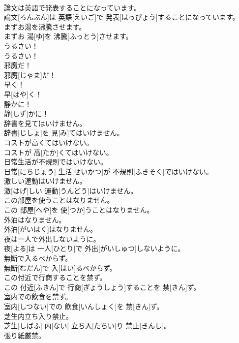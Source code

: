 \documentclass[8pt]{extreport}
\begin{document}
\begin{CJK}{UTF8}{min}
\\	論文は英語で発表することになっています。	
\\	論文[ろんぶん]は 英語[えいご]で 発表[はっぴょう]することになっています。
\\	まずお湯を沸騰させます。	
\\	まずお 湯[ゆ]を 沸騰[ふっとう]させます。
\\	うるさい！	
\\	うるさい！
\\	邪魔だ！	
\\	邪魔[じゃま]だ！
\\	早く！	
\\	早[はや]く！
\\	静かに！	
\\	静[しず]かに！
\\	辞書を見てはいけません。	
\\	辞書[じしょ]を 見[み]てはいけません。
\\	コストが高くてはいけない。	
\\	コストが 高[たか]くてはいけない。
\\	日常生活が不規則ではいけない。	
\\	日常[にちじょう] 生活[せいかつ]が 不規則[ふきそく]ではいけない。
\\	激しい運動はいけません。	
\\	激[はげ]しい 運動[うんどう]はいけません。
\\	この部屋を使うことはなりません。	
\\	この 部屋[へや]を 使[つか]うことはなりません。
\\	外泊はなりません。	
\\	外泊[がいはく]はなりません。
\\	夜は一人で外出しないように。	
\\	夜[よる]は 一人[ひとり]で 外出[がいしゅつ]しないように。
\\	無断で入るべからず。	
\\	無断[むだん]で 入[はい]るべからず。
\\	この付近で行商することを禁ず。	
\\	この 付近[ふきん]で 行商[ぎょうしょう]することを 禁[きん]ず。
\\	室内での飲食を禁ず。	
\\	室内[しつない]での 飲食[いんしょく]を 禁[きん]ず。
\\	芝生内立ち入り禁止。	
\\	芝生[しばふ] 内[ない] 立ち入[たちい]り 禁止[きんし]。
\\	張り紙厳禁。	

\end{CJK}
\end{document}
